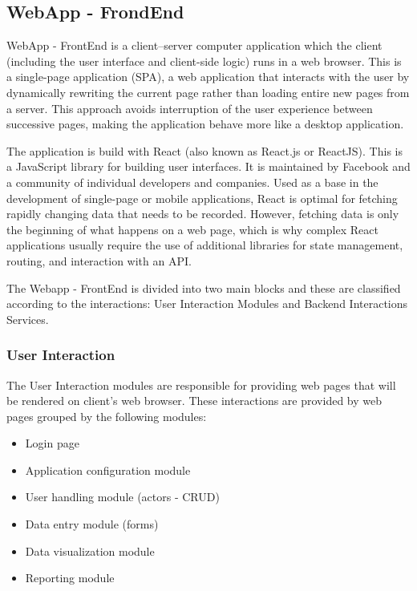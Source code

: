 \subsection{WebApp - FrondEnd}\label{sec:WebAppFrondEnd}
WebApp - FrontEnd is a client–server computer application which the client (including the user interface and client-side logic) runs in a web browser. This is a single-page application (SPA), a web application that interacts with the user by dynamically rewriting the current page rather than loading entire new pages from a server. This approach avoids interruption of the user experience between successive pages, making the application behave more like a desktop application.

The application is build with React (also known as React.js or ReactJS). This is a JavaScript library for building user interfaces. It is maintained by Facebook and a community of individual developers and companies. Used as a base in the development of single-page or mobile applications, React is optimal for fetching rapidly changing data that needs to be recorded. However, fetching data is only the beginning of what happens on a web page, which is why complex React applications usually require the use of additional libraries for state management, routing, and interaction with an API.

The Webapp - FrontEnd is divided into two main blocks and these are classified according to the interactions: User Interaction Modules and Backend Interactions Services.

\subsubsection{User Interaction}\label{sec:UserInteraction}
The User Interaction modules are responsible for providing web pages that will be rendered on client’s web browser. These interactions are provided by web pages grouped by the following modules:

\begin{itemize}
\item Login page
\item Application configuration module
\item User handling module (actors - CRUD)
\item Data entry module (forms)
\item Data visualization module
\item Reporting module
\end{itemize}

